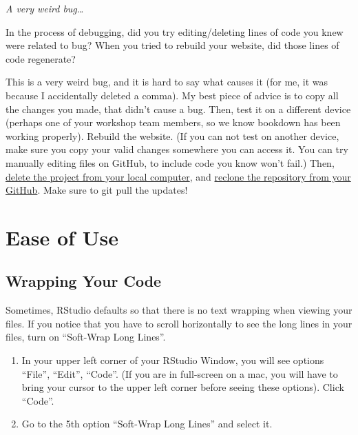 \documentclass[
]{book}
\newenvironment{redbox}{
  \definecolor{shadecolor}{RGB}{243, 154, 157}
  \color{white}
  \begin{shaded}}
 {\end{shaded}}
\theoremstyle{definition}
\theoremstyle{definition}
\theoremstyle{definition}
\theoremstyle{definition}
\theoremstyle{remark}
\begin{document}
\begin{itemize}
  \begin{redbox}

  \begin{center}
  \emph{A very weird bug\ldots{}}

  \end{center}

  In the process of debugging, did you try editing/deleting lines of code you knew were related to bug? When you tried to rebuild your website, did those lines of code regenerate?

  This is a very weird bug, and it is hard to say what causes it (for me, it was because I accidentally deleted a comma). My best piece of advice is to copy all the changes you made, that didn't cause a bug. Then, test it on a different device (perhaps one of your workshop team members, so we know bookdown has been working properly). Rebuild the website. (If you can not test on another device, make sure you copy your valid changes somewhere you can access it. You can try manually editing files on GitHub, to include code you know won't fail.) Then, \hyperref[delete-git-folder-locally]{delete the project from your local computer}, and \hyperref[git-clone]{reclone the repository from your GitHub}. Make sure to git pull the updates!

  \end{redbox}
\end{itemize}

\section{Ease of Use}\label{ease-of-use}

\subsection{Wrapping Your Code}\label{wrapping-your-code}

Sometimes, RStudio defaults so that there is no text wrapping when viewing your files. If you notice that you have to scroll horizontally to see the long lines in your files, turn on ``Soft-Wrap Long Lines''.

\begin{enumerate}
\def\labelenumi{\arabic{enumi}.}
\item
  In your upper left corner of your RStudio Window, you will see options ``File'', ``Edit'', ``Code''. (If you are in full-screen on a mac, you will have to bring your cursor to the upper left corner before seeing these options). Click ``Code''.
\item
  Go to the 5th option ``Soft-Wrap Long Lines'' and select it.
\end{enumerate}
\end{document}
